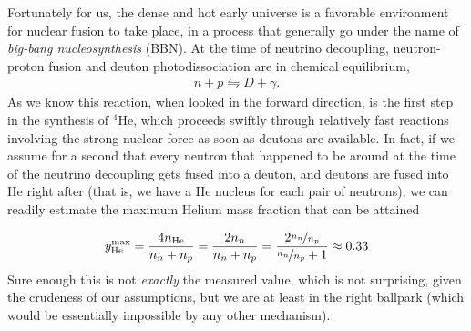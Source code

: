 Fortunately for us, the dense and hot early universe is a favorable environment
for nuclear fusion to take place, in a process that generally go under the name
of \emph{big-bang nucleosynthesis} (BBN). At the time of neutrino decoupling,
neutron-proton fusion and deuton photodissociation are in chemical equilibrium,
\begin{align}\label{eq:deuton_equilibrium}
  n + p \leftrightharpoons D + \gamma.
\end{align}
As we know this reaction, when looked in the forward direction, is the first step
in the synthesis of $^4$He, which proceeds swiftly through relatively fast reactions
involving the strong nuclear force as soon as deutons are available. In fact, if
we assume for a second that every neutron
that happened to be around at the time of the neutrino decoupling gets fused into
a deuton, and deutons are fused into He right after (that is, we have a He nucleus
for each pair of neutrons), we can readily estimate the maximum Helium mass fraction
that can be attained

\begin{align*}
  y_\text{He}^\text{max} = \frac{4 n_\text{He}}{n_n + n_p} =
  \frac{2n_n}{n_n + n_p} = \frac{2 \nicefrac{n_n}{n_p}}{\nicefrac{n_n}{n_p} + 1}
  \approx 0.33
\end{align*}
Sure enough this is not \emph{exactly} the measured value, which is not surprising,
given the crudeness of our assumptions, but we are at least in the right
ballpark (which would be essentially impossible by any other mechanism).

